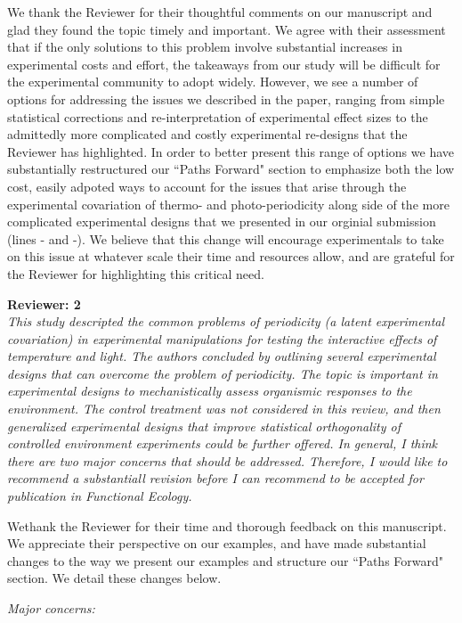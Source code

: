 \documentclass[11pt]{article}
\begin{document}
 We thank the Reviewer for their thoughtful comments on our manuscript and glad they found the topic timely and important. We agree with their assessment that if the only solutions to this problem involve substantial increases in experimental costs and effort, the takeaways from our study will be difficult for the experimental community to adopt widely. However, we see a number of options for addressing the issues we described in the paper, ranging from simple statistical corrections and re-interpretation of experimental effect sizes to the admittedly more complicated and costly experimental re-designs that the Reviewer has highlighted. In order to better present this range of options we have substantially restructured our ``Paths Forward" section to emphasize both the low cost, easily adpoted ways to account for the issues that arise through the experimental covariation of thermo- and photo-periodicity along side of the more complicated experimental designs that we presented in our orginial submission (lines - and -). We believe that this change will encourage experimentals to take on this issue at whatever scale their time and resources allow, and are grateful for the Reviewer for highlighting this critical need.

\textbf{Reviewer: 2}\\
\emph{This study descripted the common problems of periodicity (a latent experimental covariation) in experimental manipulations for testing the interactive effects of temperature and light. The authors concluded by outlining several experimental designs that can overcome the problem of periodicity. The topic is important in experimental designs to mechanistically assess organismic responses to the environment. The control treatment was not considered in this review, and then generalized experimental designs that improve statistical orthogonality of controlled environment experiments could be further offered. In general, I think there are two major concerns that should be addressed. Therefore, I would like to recommend a substantiall revision before I can recommend to be accepted for publication in Functional Ecology.}

Wethank the Reviewer for their time and thorough feedback on this manuscript. We appreciate their perspective on our examples, and have made substantial changes to the way we present our examples and structure our ``Paths Forward" section. We detail these changes below.

\emph{Major concerns:}
\end{document}
